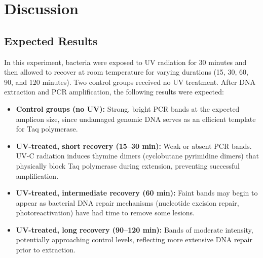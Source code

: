 \documentclass[a4paper]{article}
\begin{document}
\section{Discussion}

\subsection{Expected Results}
In this experiment, bacteria were exposed to UV radiation for 30 minutes and then allowed to recover at room temperature for varying durations (15, 30, 60, 90, and 120 minutes). Two control groups received no UV treatment. After DNA extraction and PCR amplification, the following results were expected:
\begin{itemize}
    \item \textbf{Control groups (no UV):} Strong, bright PCR bands at the expected amplicon size, since undamaged genomic DNA serves as an efficient template for Taq polymerase.
    \item \textbf{UV-treated, short recovery (15--30 min):} Weak or absent PCR bands. UV-C radiation induces thymine dimers (cyclobutane pyrimidine dimers) that physically block Taq polymerase during extension, preventing successful amplification.
    \item \textbf{UV-treated, intermediate recovery (60 min):} Faint bands may begin to appear as bacterial DNA repair mechanisms (nucleotide excision repair, photoreactivation) have had time to remove some lesions.
    \item \textbf{UV-treated, long recovery (90--120 min):} Bands of moderate intensity, potentially approaching control levels, reflecting more extensive DNA repair prior to extraction.
\end{itemize}
\end{document}
